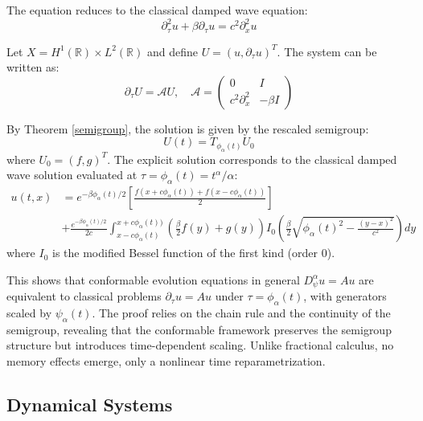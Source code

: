 \documentclass[preprint,12pt]{elsarticle}
\begin{document}
The equation reduces to the classical damped wave equation:
\begin{equation}
\partial_\tau^2 u + \beta \partial_\tau u = c^2 \partial_x^2 u
\end{equation}

Let $X = H^1(\mathbb{R}) \times L^2(\mathbb{R})$ and define $U = (u, \partial_\tau u)^T$. The system can be written as:
\begin{equation}
\partial_\tau U = \mathcal{A}U, \quad \mathcal{A} = \begin{pmatrix}
0 & I \\
c^2 \partial_x^2 & -\beta I
\end{pmatrix}
\end{equation}

By Theorem \ref{semigroup}, the solution is given by the rescaled semigroup:
\begin{equation}
U(t) = T_{\phi_\alpha(t)} U_0
\end{equation}
where $U_0 = (f,g)^T$. The explicit solution corresponds to the classical damped wave solution evaluated at $\tau =\phi_\alpha(t)= t^\alpha/\alpha$:
\begin{equation}
\begin{aligned}
u(t,x) &= e^{-\beta\phi_\alpha(t)/2}\left[\frac{f(x+c\phi_\alpha(t)) + f(x-c\phi_\alpha(t))}{2}\right] \\
&+ \frac{e^{-\beta\phi_\alpha(t)/2}}{2c}\int_{x-c\phi_\alpha(t)}^{x+c\phi_\alpha(t))} \left(\frac{\beta}{2}f(y) + g(y)\right) I_0\left(\frac{\beta}{2}\sqrt{\phi_\alpha(t)^2 - \frac{(y-x)^2}{c^2}}\right) dy
\end{aligned}
\end{equation}
where $I_{0}$ is the modified Bessel function of the first kind (order 0).

 This shows that conformable evolution equations in general \(D^\alpha_\psi u = Au\) are equivalent to classical problems \( \partial_\tau u = Au \) under \(\tau = \phi_\alpha(t)\), with generators scaled by \(\psi_\alpha(t)\). The proof relies on the chain rule and the continuity of the semigroup, revealing that the conformable framework preserves the semigroup structure but introduces time-dependent scaling. Unlike fractional calculus, no memory effects emerge, only a nonlinear time reparametrization.

\subsection{Dynamical Systems}
\end{document}
